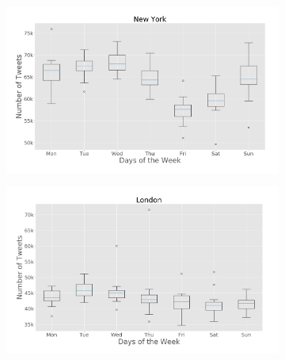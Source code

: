 \begin{figure}[h]
    \begin{subfigure}[t]{0.45\textwidth}
        \centering
        \includegraphics[width=1\linewidth]{figures/nyc_box_plt_day_of_week.png}
        \caption{}
        \label{fig:newyork_box_plot_day_of_week}
    \end{subfigure}
    \quad
    \begin{subfigure}[t]{0.45\textwidth}
        \centering
        \includegraphics[width=1\linewidth]{figures/london_box_plt_day_of_week.png}
        \caption{}
        \label{fig:london_box_plot_day_of_week}
    \end{subfigure}

	\medskip
    

\end{figure}
